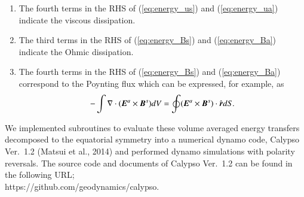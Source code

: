 \begin{enumerate}
\item 
The fourth terms in the RHS of (\ref{eq:energy_us}) and (\ref{eq:energy_ua}) indicate the viscous dissipation.

\item 
The third terms in the RHS of (\ref{eq:energy_Bs}) and (\ref{eq:energy_Ba}) indicate the Ohmic dissipation.

\item 
The fourth terms in the RHS of (\ref{eq:energy_Bs}) and (\ref{eq:energy_Ba}) correspond to the Poynting flux which can be expressed, for example, as
\begin{equation}
-\int \nabla \cdot
  ( \mbox{\boldmath$E$}^a \times \mbox{\boldmath$B$}^s ) d V =
 \oint (\mbox{\boldmath$E$}^a \times \mbox{\boldmath$B$}^s )
   \cdot \hat{\mbox{\boldmath$r$}} d S .
\label{eq:Poynting}
\end{equation}
\end{enumerate}
%
%

We implemented subroutines to evaluate these volume averaged energy transfers decomposed to the equatorial symmetry into a numerical dynamo code, Calypso Ver.~1.2 (Matsui et al., 2014) 
and performed dynamo simulations with polarity reversals.
%
The source code and documents of Calypso Ver.~1.2 can be found in the following URL;\\
https://github.com/geodynamics/calypso.\\
